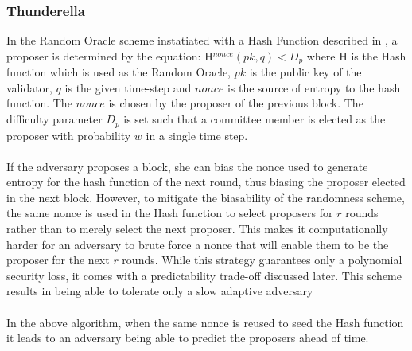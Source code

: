 \documentclass[10pt,journal,compsoc]{IEEEtran}
\begin{document}
\subsubsection{Thunderella}
In the Random Oracle scheme instatiated with a Hash Function described in \cite{SnowWhite}, a proposer is determined by the equation:
H$^{nonce}(pk, q) < D_p$ where H is the Hash function which is used as the Random Oracle, $pk$ is the public key of the validator, $q$ is the given time-step and $nonce$ is the source of entropy to the hash function. The $nonce$ is chosen by the proposer of the previous block. The difficulty parameter $D_p$ is set such that a committee member is elected as the proposer with probability $w$ in a single time step. 
\\\\
If the adversary proposes a block, she can bias the nonce used to generate entropy for the hash function of the next round, thus biasing the proposer elected in the next block. However, to mitigate the biasability of the randomness scheme, the same nonce is used in the Hash function to select proposers for $r$ rounds rather than to merely select the next proposer. This makes it computationally harder for an adversary to brute force a nonce that will enable them to be the proposer for the next $r$ rounds. While this strategy guarantees only a polynomial security loss, it comes with a predictability trade-off discussed later. This scheme results in being able to tolerate only a slow adaptive adversary
\\\\
In the above algorithm, when the same nonce is reused to seed the Hash function it leads to an adversary being able to predict the proposers ahead of time. 
\end{document}

